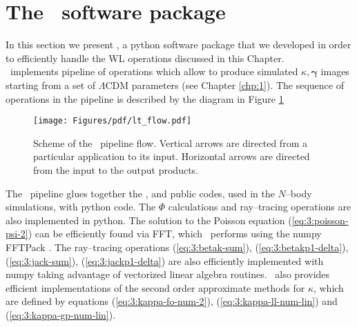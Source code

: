 
\section{The \LT\, software package}
\label{sec:3:lt}
In this section we present \LT \citep{lenstools}, a {\sc python} software package that we developed in order to efficiently handle the WL operations discussed in this Chapter. \\ \LT\, implements pipeline of operations which allow to produce simulated $\kappa,\pmb{\gamma}$ images starting from a set of $\Lambda$CDM parameters (see Chapter \ref{chp:1}). The sequence of operations in the pipeline is described by the diagram in Figure \ref{fig:3:lt-flow}  
%
\begin{figure}
\begin{center}
\texttt{[image: Figures/pdf/lt\_flow.pdf]}
\end{center}
\caption{Scheme of the \LT\, pipeline flow. Vertical arrows are directed from a particular application to its input. Horizontal arrows are directed from the input to the output products.}
\label{fig:3:lt-flow}
\end{figure}
%
The \LT\, pipeline glues together the ,  and  public codes, used in the $N$--body simulations, with {\sc python} code. The $\Phi$ calculations and ray--tracing operations are also implemented in {\sc python}. The solution to the Poisson equation (\ref{eq:3:poisson-psi-2}) can be efficiently found via FFT, which \LT\, performs using the {\sc numpy} FFTPack \citep{scipy}. The ray--tracing operations (\ref{eq:3:betak-sum}), (\ref{eq:3:betakp1-delta}), (\ref{eq:3:jack-sum}), (\ref{eq:3:jackp1-delta}) are also efficiently implemented with {\sc numpy} taking advantage of vectorized linear algebra routines. \LT\, also provides efficient implementations of the second order approximate methods for $\kappa$, which are defined by equations (\ref{eq:3:kappa-fo-num-2}), (\ref{eq:3:kappa-ll-num-lin}) and (\ref{eq:3:kappa-gp-num-lin}). 

